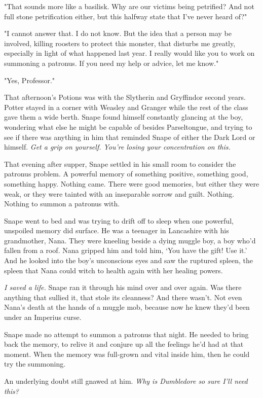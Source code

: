 "That sounds more like a basilisk. Why are our victims being petrified? And not full stone petrification either, but this halfway state that I've never heard of?"

"I cannot answer that. I do not know. But the idea that a person may be involved, killing roosters to protect this monster, that disturbs me greatly, especially in light of what happened last year. I really would like you to work on summoning a patronus. If you need my help or advice, let me know."

"Yes, Professor."

That afternoon's Potions was with the Slytherin and Gryffindor second years. Potter stayed in a corner with Weasley and Granger while the rest of the class gave them a wide berth. Snape found himself constantly glancing at the boy, wondering what else he might be capable of besides Parseltongue, and trying to see if there was anything in him that reminded Snape of either the Dark Lord or himself. \emph{Get a grip on yourself. You're losing your concentration on this.}

That evening after supper, Snape settled in his small room to consider the patronus problem. A powerful memory of something positive, something good, something happy. Nothing came. There were good memories, but either they were weak, or they were tainted with an inseparable sorrow and guilt. Nothing. Nothing to summon a patronus with.

Snape went to bed and was trying to drift off to sleep when one powerful, unspoiled memory did surface. He was a teenager in Lancashire with his grandmother, Nana. They were kneeling beside a dying muggle boy, a boy who'd fallen from a roof. Nana gripped him and told him, `You have the gift! Use it.' And he looked into the boy's unconscious eyes and saw the ruptured spleen, the spleen that Nana could witch to health again with her healing powers.

\emph{I saved a life.} Snape ran it through his mind over and over again. Was there anything that sullied it, that stole its cleanness? And there wasn't. Not even Nana's death at the hands of a muggle mob, because now he knew they'd been under an Imperius curse.

Snape made no attempt to summon a patronus that night. He needed to bring back the memory, to relive it and conjure up all the feelings he'd had at that moment. When the memory was full-grown and vital inside him, then he could try the summoning.

An underlying doubt still gnawed at him. \emph{Why is Dumbledore so sure I'll need this?}

